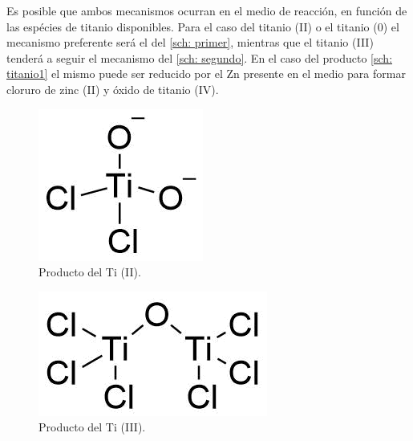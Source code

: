 \documentclass[fleqn,11pt]{SelfArx}
\begin{document}
Es posible que ambos mecanismos ocurran en el medio de reacci\'on, en funci\'on de las esp\'ecies de titanio disponibles. Para el caso del titanio (II) o el titanio (0) el mecanismo preferente ser\'a el del \autoref{sch: primer}, mientras que el titanio (III) tender\'a a seguir el mecanismo del \autoref{sch: segundo}. En el caso del producto \autoref{sch: titanio1} el mismo puede ser reducido por el Zn presente en el medio para formar cloruro de zinc (II) y \'oxido de titanio (IV).
\begin{scheme}[h]
	\centering
	\scriptsize
	\begin{subfigure}[t]{0.49\linewidth}
		\centering
		\includegraphics[width=0.4\linewidth]{structures/titanium1.png}
		\caption{Producto del Ti (II).}
		\label{sch: titanio1}
	\end{subfigure}
	\begin{subfigure}[t]{0.3\linewidth}
		\centering
		\includegraphics[width=0.9\linewidth]{structures/titanium2.png}
		\caption{Producto del Ti (III).}
		\label{sch: titanio2}
	\end{subfigure}
	\caption{Complejos asociados a los mecanismos propuestos.}
\end{scheme}
\end{document}
